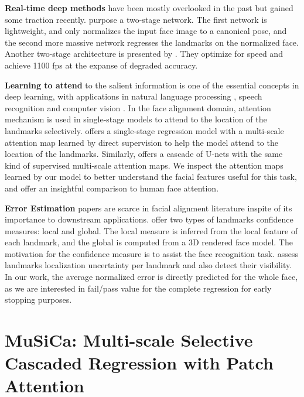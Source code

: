 \documentclass[9pt,twocolumn]{extarticle}
\begin{document}
\textbf{Real-time deep methods} have been mostly overlooked in the past but gained some traction recently. \cite{liu2019efficient} purpose a two-stage network. The first network is lightweight, and only normalizes the input face image to a canonical pose, and the second more massive network regresses the landmarks on the normalized face. Another two-stage architecture is presented by \cite{duan2019faster}. They optimize for speed and achieve 1100 fps at the expanse of degraded accuracy. 

\textbf{Learning to attend} to the salient information is one of the essential concepts in deep learning, with applications in natural language processing \cite{wang2016attention, vaswani2017attention}, speech recognition \cite{chorowski2015attention, bahdanau2016end} and computer vision \cite{you2016image, mnih2014recurrent, parmar2019stand}. In the face alignment domain, attention mechanism is used in single-stage models to attend to the location of the landmarks selectively. \cite{yue2018attentional} offers a single-stage regression model with a multi-scale attention map learned by direct supervision to help the model attend to the location of the landmarks. Similarly, \cite{dapogny2019decafa} offers a cascade of U-nets with the same kind of supervised multi-scale attention maps. We inspect the attention maps learned by our model to better understand the facial features useful for this task, and offer an insightful comparison to human face attention.


\textbf{Error Estimation} papers are scarce in facial alignment literature inspite of its importance to downstream applications. \cite{kim2017local} offer two types of landmarks confidence measures: local and global. The local measure is inferred from the local feature of each landmark, and the global is computed from a 3D rendered face model. The motivation for the confidence measure is to assist the face recognition task. \cite{kumar2020luvli} assess landmarks localization uncertainty per landmark and also detect their visibility. In our work, the average normalized error is directly predicted for the whole face, as we are interested in fail/pass value for the complete regression for early stopping purposes.



\section{MuSiCa: Multi-scale Selective Cascaded Regression with Patch Attention}
\end{document}
